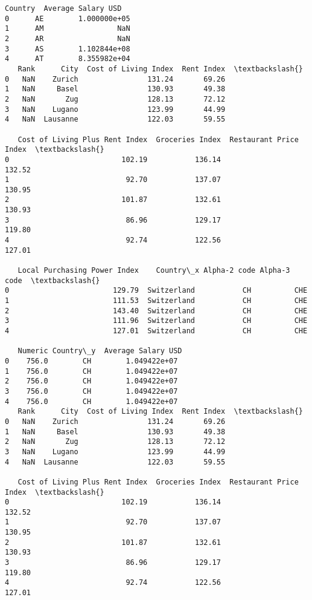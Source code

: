 \documentclass[11pt]{article}
\begin{document}
    \begin{Verbatim}[commandchars=\\\{\}]
  Country  Average Salary USD
0      AE        1.000000e+05
1      AM                 NaN
2      AR                 NaN
3      AS        1.102844e+08
4      AT        8.355982e+04
   Rank      City  Cost of Living Index  Rent Index  \textbackslash{}
0   NaN    Zurich                131.24       69.26
1   NaN     Basel                130.93       49.38
2   NaN       Zug                128.13       72.12
3   NaN    Lugano                123.99       44.99
4   NaN  Lausanne                122.03       59.55

   Cost of Living Plus Rent Index  Groceries Index  Restaurant Price Index  \textbackslash{}
0                          102.19           136.14                  132.52
1                           92.70           137.07                  130.95
2                          101.87           132.61                  130.93
3                           86.96           129.17                  119.80
4                           92.74           122.56                  127.01

   Local Purchasing Power Index    Country\_x Alpha-2 code Alpha-3 code  \textbackslash{}
0                        129.79  Switzerland           CH          CHE
1                        111.53  Switzerland           CH          CHE
2                        143.40  Switzerland           CH          CHE
3                        111.96  Switzerland           CH          CHE
4                        127.01  Switzerland           CH          CHE

   Numeric Country\_y  Average Salary USD
0    756.0        CH        1.049422e+07
1    756.0        CH        1.049422e+07
2    756.0        CH        1.049422e+07
3    756.0        CH        1.049422e+07
4    756.0        CH        1.049422e+07
   Rank      City  Cost of Living Index  Rent Index  \textbackslash{}
0   NaN    Zurich                131.24       69.26
1   NaN     Basel                130.93       49.38
2   NaN       Zug                128.13       72.12
3   NaN    Lugano                123.99       44.99
4   NaN  Lausanne                122.03       59.55

   Cost of Living Plus Rent Index  Groceries Index  Restaurant Price Index  \textbackslash{}
0                          102.19           136.14                  132.52
1                           92.70           137.07                  130.95
2                          101.87           132.61                  130.93
3                           86.96           129.17                  119.80
4                           92.74           122.56                  127.01


\end{Verbatim}
\end{document}
